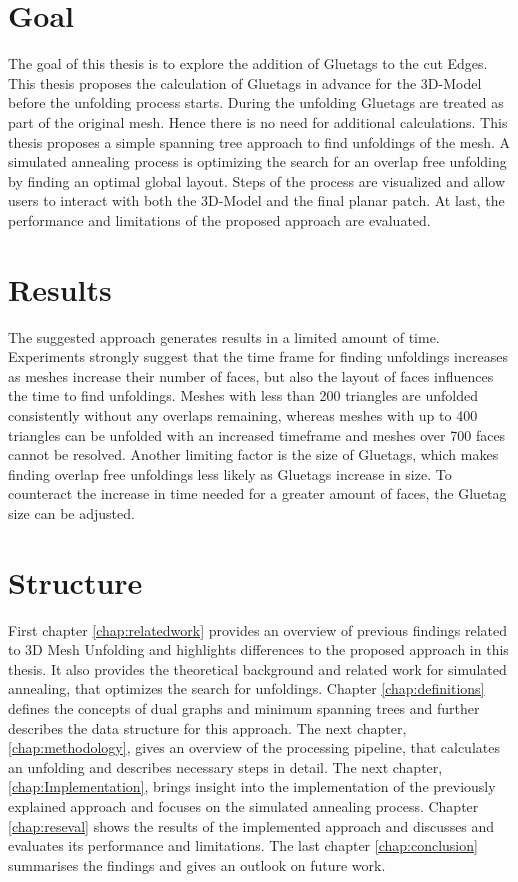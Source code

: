 \documentclass[draft,final]{vutinfth} %
\begin{document}
\section{Goal}
The goal of this thesis is to explore the addition of Gluetags to the cut Edges. This thesis proposes the calculation of Gluetags in advance for the 3D-Model before the unfolding process starts. During the unfolding Gluetags are treated as part of the original mesh. Hence there is no need for additional calculations. This thesis proposes a simple spanning tree approach to find unfoldings of the mesh. A simulated annealing process is optimizing the search for an overlap free unfolding by finding an optimal global layout. Steps of the process are visualized and allow users to interact with both the 3D-Model and the final planar patch. At last, the performance and limitations of the proposed approach are evaluated.

\section{Results}
The suggested approach generates results in a limited amount of time. Experiments strongly suggest that the time frame for finding unfoldings increases as meshes increase their number of faces, but also the layout of faces influences the time to find unfoldings. Meshes with less than 200 triangles are unfolded consistently without any overlaps remaining, whereas meshes with up to 400 triangles can be unfolded with an increased timeframe and meshes over 700 faces cannot be resolved. Another limiting factor is the size of Gluetags, which makes finding overlap free unfoldings less likely as Gluetags increase in size. To counteract the increase in time needed for a greater amount of faces, the Gluetag size can be adjusted.

\section{Structure}
First chapter \ref{chap:relatedwork} provides an overview of previous findings related to 3D Mesh Unfolding and highlights differences to the proposed approach in this thesis. It also provides the theoretical background and related work for simulated annealing, that optimizes the search for unfoldings. Chapter \ref{chap:definitions} defines the concepts of dual graphs and minimum spanning trees and further describes the data structure for this approach. The next chapter, \ref{chap:methodology}, gives an overview of the processing pipeline, that calculates an unfolding and describes necessary steps in detail. The next chapter, \ref{chap:Implementation}, brings insight into the implementation of the previously explained approach and focuses on the simulated annealing process. Chapter \ref{chap:reseval} shows the results of the implemented approach and discusses and evaluates its performance and limitations. The last chapter \ref{chap:conclusion} summarises the findings and gives an outlook on future work.
\end{document}
